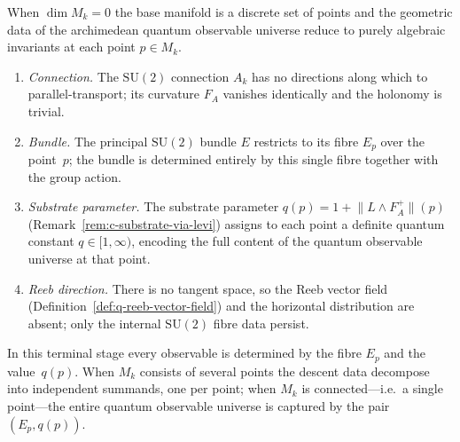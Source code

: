 \begin{remark}
\label{rem:descent-reduction-zero}
When $\dim M_k = 0$ the base manifold is a discrete set of points and
the geometric data of the archimedean quantum observable universe
reduce to purely algebraic invariants at each point $p\in M_k$.
\begin{enumerate}
  \item \emph{Connection.}  The $\mathrm{SU}(2)$ connection $A_k$ has no
        directions along which to parallel-transport; its curvature
        $F_A$ vanishes identically and the holonomy is trivial.
  \item \emph{Bundle.}  The principal $\mathrm{SU}(2)$ bundle $E$
        restricts to its fibre $E_p$ over the point~$p$; the bundle
        is determined entirely by this single fibre together with
        the group action.
  \item \emph{Substrate parameter.}  The substrate parameter
        $q(p) = 1 + \lVert L\wedge F_A^{+}\rVert(p)$
        (Remark~\ref{rem:c-substrate-via-levi}) assigns to each point a
        definite quantum constant $q\in[1,\infty)$, encoding the full
        content of the quantum observable universe at that point.
  \item \emph{Reeb direction.}  There is no tangent space, so the Reeb
        vector field (Definition~\ref{def:q-reeb-vector-field}) and the
        horizontal distribution are absent; only the internal
        $\mathrm{SU}(2)$ fibre data persist.
\end{enumerate}
In this terminal stage every observable is determined by the fibre
$E_p$ and the value~$q(p)$.  When $M_k$ consists of several points the
descent data decompose into independent summands, one per point; when
$M_k$ is connected---i.e.\ a single point---the entire quantum
observable universe is captured by the pair $(E_p, q(p))$.
\end{remark}

